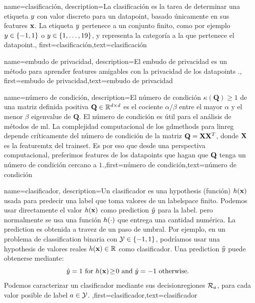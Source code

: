 {name={clasificación},
description={La clasificación es la tarea de determinar una
	etiqueta $y$  con valor discreto para un \gls{datapoint}, basado únicamente en sus 
	 \gls{feature}s ${\bf x}$. La etiqueta $y$ pertenece a un conjunto finito, como por ejemplo 
	$y \in \{-1,1\}$ o $y \in \{1,\ldots,19\}$, y representa la 
	categoría a la que pertenece el \gls{datapoint}.},
	first={clasificación},text={clasificación} 
}


{name={embudo de privacidad},
description={El embudo de privacidad es un método para aprender \gls{feature}s 
	amigables con la privacidad de los \gls{datapoint}s \cite{PrivacyFunnel}.},
first={embudo de privacidad},text={embudo de privacidad} 
}




{
	name={número de condición},
	description={El número de condición $\kappa(\mathbf{Q}) \geq 1$ de una 
		matriz definida positiva $\mathbf{Q} \in \mathbb{R}^{d \times d}$ es el cociente 
		$\alpha /\beta  $ entre el 
		mayor $\alpha$ y el menor $\beta$ \gls{eigenvalue} de 
		$\mathbf{Q}$. El número de condición es útil para el análisis de métodos de \gls{ml}. 
		La complejidad computacional de los \gls{gdmethods} para \gls{linreg} depende críticamente del número 
		de condición de la matriz $\mathbf{Q} = {\bf X} {\bf X}^{T}$, donde ${\bf X}$  es la \gls{featuremtx}  
		del \gls{trainset}. Es por eso que desde una perspectiva computacional, preferimos \gls{feature}s de los 
		\gls{datapoint}s que hagan que $\mathbf{Q}$ tenga un número de condición cercano a $1$.},first={número de condición},text={número de condición} 
}

{
	name={clasificador},
	description={Un clasificador es una \gls{hypothesis} (función) $h({\bf x})$ 
		usada para predecir una \gls{label} que toma valores de un \gls{labelspace} finito. Podemos usar directamente 
		el valor $h({\bf x})$ como \gls{prediction} $\hat{y}$ para 
		la \gls{label}. pero normalmente se usa una función $h(\cdot)$ que entrega 
		una cantidad numérica. La \gls{prediction} es obtenida a travez de un paso de umbral. 
		Por ejemplo, en un problema de \gls{classification} binaria con \label{labelspace} $\mathcal{Y} \in  \{ -1,1\}$, 
		podríamos usar una \gls{hypothesis} de valores reales $h({\bf x}) \in \mathbb{R}$ 
		como clasificador. Una \gls{prediction} $\hat{y}$ puede obtenerse mediante:  
		 \begin{equation} 
		 	\label{equ_def_threshold_bin_classifier_dict}
		 	\hat{y} =1   \mbox{ for } h({\bf x})\!\geq\!0 \mbox{ and } 	\hat{y} =-1  \mbox{ otherwise.}
	 		\end{equation}
		Podemos caracterizar un clasificador mediante sus \gls{decisionregion}es $\mathcal{R}_{a}$, para 
		cada valor posible de \gls{label} $a \in \mathcal{Y}$. },first={clasificador},text={clasificador} 
}

